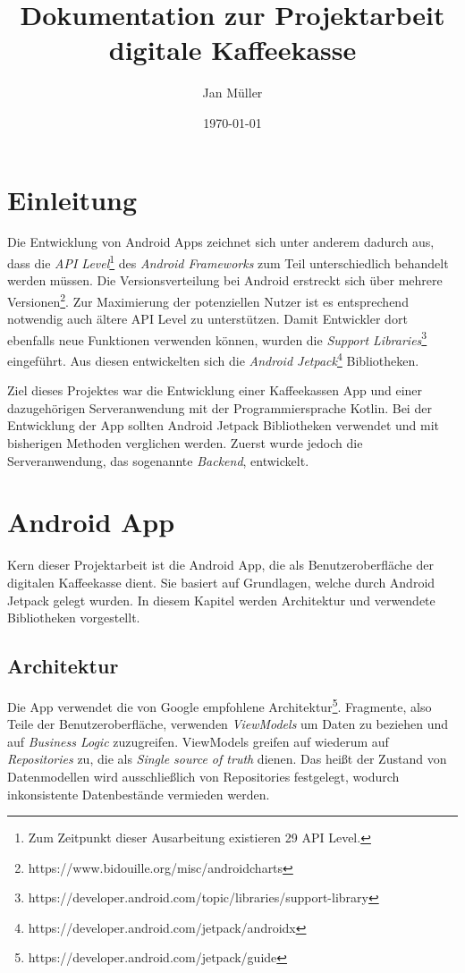 \documentclass[a4paper, 11pt]{article}
\title{Dokumentation zur Projektarbeit digitale Kaffeekasse}
\author{Jan Müller}
\date{\today}
\begin{document}
\maketitle

\section{Einleitung}
\label{sec:intro}
Die Entwicklung von Android Apps zeichnet sich unter anderem dadurch aus, dass die \textit{API Level}\footnote{Zum Zeitpunkt dieser Ausarbeitung existieren 29 API Level.} des \textit{Android Frameworks} zum Teil unterschiedlich behandelt werden müssen.
Die Versionsverteilung bei Android erstreckt sich über mehrere Versionen\footnote{https://www.bidouille.org/misc/androidcharts}.
Zur Maximierung der potenziellen Nutzer ist es entsprechend notwendig auch ältere API Level zu unterstützen.
Damit Entwickler dort ebenfalls neue Funktionen verwenden können, wurden die \textit{Support Libraries}\footnote{https://developer.android.com/topic/libraries/support-library} eingeführt.
Aus diesen entwickelten sich die \textit{Android Jetpack}\footnote{https://developer.android.com/jetpack/androidx} Bibliotheken.

Ziel dieses Projektes war die Entwicklung einer Kaffeekassen App und einer dazugehörigen Serveranwendung mit der Programmiersprache Kotlin.
Bei der Entwicklung der App sollten Android Jetpack Bibliotheken verwendet und mit bisherigen Methoden verglichen werden.
Zuerst wurde jedoch die Serveranwendung, das sogenannte \textit{Backend}, entwickelt.

\section{Android App}
\label{sec:app}

Kern dieser Projektarbeit ist die Android App, die als Benutzeroberfläche der digitalen Kaffeekasse dient.
Sie basiert auf Grundlagen, welche durch Android Jetpack gelegt wurden.
In diesem Kapitel werden Architektur und verwendete Bibliotheken vorgestellt.

\subsection{Architektur}
\label{subsec:app:architecture}
Die App verwendet die von Google empfohlene Architektur\footnote{https://developer.android.com/jetpack/guide}.
Fragmente, also Teile der Benutzeroberfläche, verwenden \textit{ViewModels} um Daten zu beziehen und auf \textit{Business Logic} zuzugreifen.
ViewModels greifen auf wiederum auf \textit{Repositories} zu, die als \textit{Single source of truth} dienen.
Das heißt der Zustand von Datenmodellen wird ausschließlich von Repositories festgelegt, wodurch inkonsistente Datenbestände vermieden werden.
\end{document}
